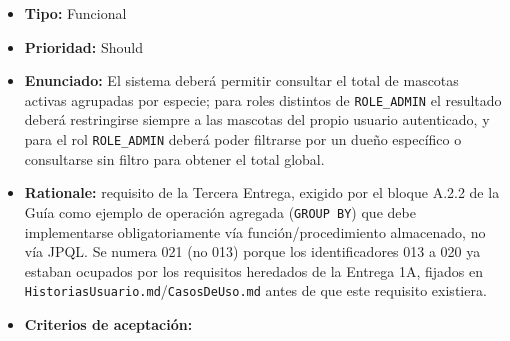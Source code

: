\documentclass[
  spanish,
]{article}
\providecommand{\tightlist}{%
  \setlength{\itemsep}{0pt}\setlength{\parskip}{0pt}}
\begin{document}
\begin{itemize}
\tightlist
\item
  \textbf{Tipo:} Funcional
\item
  \textbf{Prioridad:} Should
\item
  \textbf{Enunciado:} El sistema deberá permitir consultar el total de
  mascotas activas agrupadas por especie; para roles distintos de
  \texttt{ROLE\_\allowbreak{}ADMIN} el resultado deberá restringirse siempre a las
  mascotas del propio usuario autenticado, y para el rol
  \texttt{ROLE\_\allowbreak{}ADMIN} deberá poder filtrarse por un dueño específico o
  consultarse sin filtro para obtener el total global.
\item
  \textbf{Rationale:} requisito de la Tercera Entrega, exigido por el
  bloque A.2.2 de la Guía como ejemplo de operación agregada
  (\texttt{GROUP\ BY}) que debe implementarse obligatoriamente vía
  función/procedimiento almacenado, no vía JPQL. Se numera 021 (no 013)
  porque los identificadores 013 a 020 ya estaban ocupados por los
  requisitos heredados de la Entrega 1A, fijados en
  \texttt{Historias\allowbreak{}Usuario.\allowbreak{}md}/\texttt{Casos\allowbreak{}De\allowbreak{}Uso.\allowbreak{}md} antes de que este
  requisito existiera.
\item
  \textbf{Criterios de aceptación:}


\end{itemize}
\end{document}

